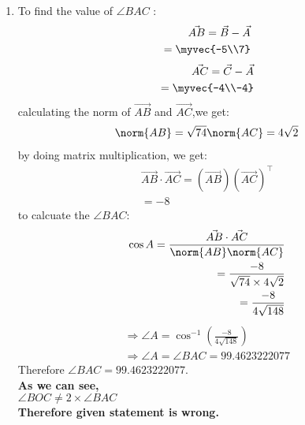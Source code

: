 \documentclass[journal,12pt,twocolumn]{IEEEtran}
\theoremstyle{remark}
\begin{document}
\begin{enumerate}
	\item To find  the value of $\angle{BAC}$ :
\begin{align}
\Vec{AB}=\Vec{B}-\Vec{A}\\
          =\myvec{-5\\7}
\end{align}
\vspace{0.1cm}
\begin{align}
\Vec{AC}=\Vec{C}-\Vec{A}\\
          =\myvec{-4\\-4}
\end{align}
\vspace{0.1cm}
calculating the norm of $\Vec{AB}$ and $\Vec{AC}$,we get:
\begin{align}
	\norm{AB}= \sqrt{74}
	\norm{AC}= 4\sqrt{2}
\end{align}
\vspace{0.2cm}
by doing matrix multiplication, we get:
\begin{align}
\Vec{AB}\cdot\Vec{AC}=(\Vec{AB})(\Vec{AC})^\intercal\\
= -8
\end{align}
\vspace{0.2cm}
to calcuate the $\angle{BAC}$:
\begin{align}
	\cos{A}=\frac{\Vec{AB}\cdot\Vec{AC}}{\norm{AB}\norm{AC}}\\
=\frac{-8}{\sqrt{74}\times4\sqrt{2}}\\
=\frac{-8}{4\sqrt{148}}
\end{align}
\vspace{0.1cm}
\begin{align}
\Rightarrow\angle{A}=\cos^{-1}\left(\frac{-8}{4\sqrt{148}}\right)\\
\Rightarrow\angle{A}=\angle{BAC}=99.4623222077
\end{align}
\vspace{0.4cm}
Therefore $\angle{BAC}=99.4623222077$.\\
\vspace{0.5cm}
\textbf{As we can see,\\ $\angle{BOC}\neq2\times\angle{BAC}$\\Therefore given statement is wrong.}
\end{enumerate}
\end{document}
